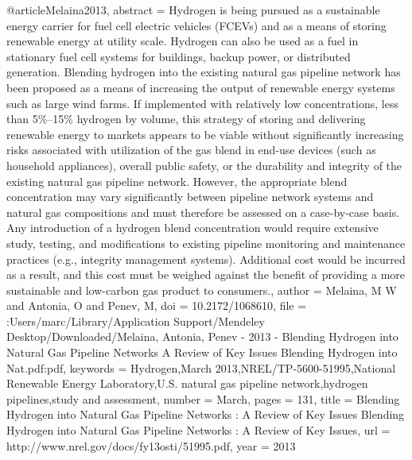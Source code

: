 @article{Melaina2013,
abstract = {Hydrogen is being pursued as a sustainable energy carrier for fuel cell electric vehicles (FCEVs) and as a means of storing renewable energy at utility scale. Hydrogen can also be used as a fuel in stationary fuel cell systems for buildings, backup power, or distributed generation. Blending hydrogen into the existing natural gas pipeline network has been proposed as a means of increasing the output of renewable energy systems such as large wind farms. If implemented with relatively low concentrations, less than 5{\%}–15{\%} hydrogen by volume, this strategy of storing and delivering renewable energy to markets appears to be viable without significantly increasing risks associated with utilization of the gas blend in end-use devices (such as household appliances), overall public safety, or the durability and integrity of the existing natural gas pipeline network. However, the appropriate blend concentration may vary significantly between pipeline network systems and natural gas compositions and must therefore be assessed on a case-by-case basis. Any introduction of a hydrogen blend concentration would require extensive study, testing, and modifications to existing pipeline monitoring and maintenance practices (e.g., integrity management systems). Additional cost would be incurred as a result, and this cost must be weighed against the benefit of providing a more sustainable and low-carbon gas product to consumers.},
author = {Melaina, M W and Antonia, O and Penev, M},
doi = {10.2172/1068610},
file = {:Users/marc/Library/Application Support/Mendeley Desktop/Downloaded/Melaina, Antonia, Penev - 2013 - Blending Hydrogen into Natural Gas Pipeline Networks A Review of Key Issues Blending Hydrogen into Nat.pdf:pdf},
keywords = {Hydrogen,March 2013,NREL/TP-5600-51995,National Renewable Energy Laboratory,U.S. natural gas pipeline network,hydrogen pipelines,study and assessment},
number = {March},
pages = {131},
title = {{Blending Hydrogen into Natural Gas Pipeline Networks : A Review of Key Issues Blending Hydrogen into Natural Gas Pipeline Networks : A Review of Key Issues}},
url = {http://www.nrel.gov/docs/fy13osti/51995.pdf},
year = {2013}
}
